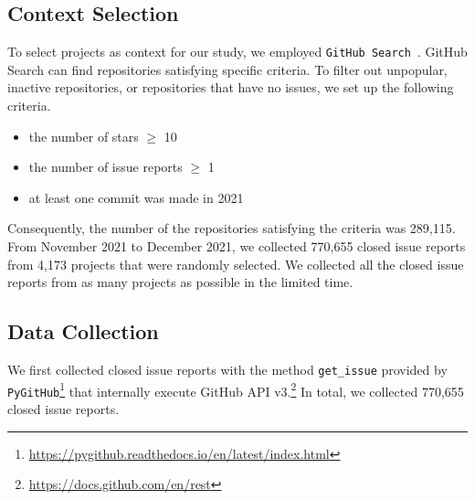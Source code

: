\subsection{Context Selection}
\label{sec:design:context}
To select projects as context for our study, we employed \texttt{GitHub Search}~\citep{msr2021data}. GitHub Search can find repositories satisfying specific criteria. To filter out unpopular, inactive repositories, or repositories that have no issues, we set up the following criteria.
\begin{itemize}
	\item the number of stars $\geq$ 10
	\item the number of issue reports $\geq$ 1
	\item at least one commit was made in 2021
\end{itemize}
Consequently, the number of the repositories satisfying the criteria was 289,115. From November 2021 to December 2021, we collected 770,655 closed issue reports from 4,173 projects that were randomly selected. 
We collected all the closed issue reports from as many projects as possible in the limited time.  



% 

\subsection{Data Collection}
We first collected closed issue reports with the method \texttt{get\_issue} provided by  \texttt{PyGitHub}\footnote{\url{https://pygithub.readthedocs.io/en/latest/index.html}} that internally execute GitHub API v3.\footnote{\url{https://docs.github.com/en/rest}} In total, we collected 770,655 closed issue reports. 

